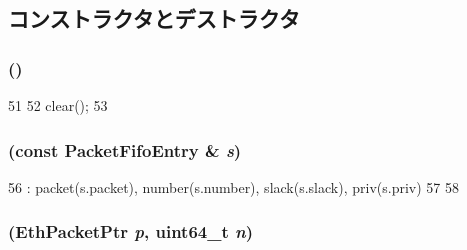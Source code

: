 \subsection{コンストラクタとデストラクタ}
\hypertarget{structPacketFifoEntry_a92f16d63f54e558d12120891731012fd}{
\subsubsection[{PacketFifoEntry}]{ ()}}
\label{structPacketFifoEntry_a92f16d63f54e558d12120891731012fd}



\begin{DoxyCode}
51     {
52         clear();
53     }
\end{DoxyCode}
\hypertarget{structPacketFifoEntry_aad99b038036dbba71b56bd78cdf6f150}{
\subsubsection[{PacketFifoEntry}]{ (const {\bf PacketFifoEntry} \& {\em s})}}
\label{structPacketFifoEntry_aad99b038036dbba71b56bd78cdf6f150}



\begin{DoxyCode}
56         : packet(s.packet), number(s.number), slack(s.slack), priv(s.priv)
57     {
58     }
\end{DoxyCode}
\hypertarget{structPacketFifoEntry_aa20d1fd6eba8c0cc64ec1bbe2d28a8e7}{
\subsubsection[{PacketFifoEntry}]{ ({\bf EthPacketPtr} {\em p}, \/  uint64\_\-t {\em n})}}
\label{structPacketFifoEntry_aa20d1fd6eba8c0cc64ec1bbe2d28a8e7}



